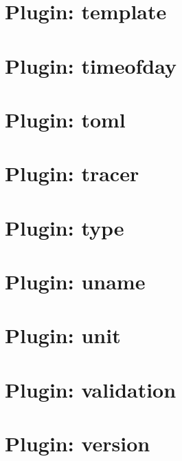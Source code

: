 \let\mypdfximage\pdfximage\def\pdfximage{\immediate\mypdfximage}\documentclass[twoside]{book}
\newcommand{\+}{\discretionary{\mbox{\scriptsize$\hookleftarrow$}}{}{}}
\begin{document}
\chapter{Plugin\+: template}
\label{md_src_plugins_template_README}

\chapter{Plugin\+: timeofday}
\label{md_src_plugins_timeofday_README}

\chapter{Plugin\+: toml}
\label{md_src_plugins_toml_README}

\chapter{Plugin\+: tracer}
\label{md_src_plugins_tracer_README}

\chapter{Plugin\+: type}
\label{md_src_plugins_type_README}

\chapter{Plugin\+: uname}
\label{md_src_plugins_uname_README}

\chapter{Plugin\+: unit}
\label{md_src_plugins_unit_README}

\chapter{Plugin\+: validation}
\label{md_src_plugins_validation_README}

\chapter{Plugin\+: version}
\label{md_src_plugins_version_README}

\end{document}
